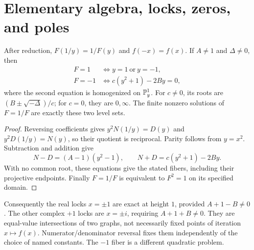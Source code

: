 \section{Elementary algebra, locks, zeros, and poles}\label{sec:elementary}

\begin{proposition}\label{prop:levels}
After reduction, \(F(1/y)=1/F(y)\) and \(f(-x)=f(x)\). If \(A\ne1\) and \(\Delta\ne0\), then
\begin{align}
F=1&\iff y=1\ \text{or}\ y=-1,\label{eq:pluslevel}\\
F=-1&\iff c(y^2+1)-2By=0,\label{eq:minuslevel}
\end{align}
where the second equation is homogenized on \(\mathbb P^1_y\). For \(c\ne0\), its roots are \((B\pm\sqrt{-\Delta})/c\); for \(c=0\), they are \(0,\infty\). The finite nonzero solutions of \(F=1/F\) are exactly these two level sets.
\end{proposition}
\begin{proof}
Reversing coefficients gives \(y^2N(1/y)=D(y)\) and \(y^2D(1/y)=N(y)\), so their quotient is reciprocal. Parity follows from \(y=x^2\). Subtraction and addition give
\begin{equation}\label{eq:sumdifference}
N-D=(A-1)(y^2-1),\qquad N+D=c(y^2+1)-2By.
\end{equation}
With no common root, these equations give the stated fibers, including their projective endpoints. Finally \(F=1/F\) is equivalent to \(F^2=1\) on its specified domain.
\end{proof}

Consequently the real locks \(x=\pm1\) are exact at height \(1\), provided \(A+1-B\ne0\). The other complex \(+1\) locks are \(x=\pm i\), requiring \(A+1+B\ne0\). They are equal-value intersections of two graphs, not necessarily fixed points of iteration \(x\mapsto f(x)\). Numerator/denominator reversal fixes them independently of the choice of named constants. The \(-1\) fiber is a different quadratic problem.

